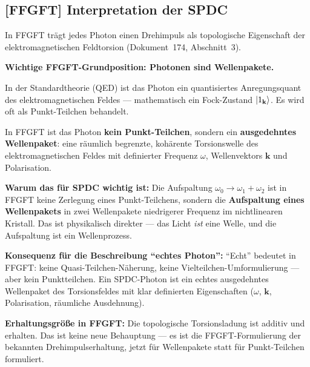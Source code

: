\subsection{[FFGFT] Interpretation der SPDC}

\begin{foundation}
In FFGFT trägt jedes Photon einen Drehimpuls als
topologische Eigenschaft der elektromagnetischen Feldtorsion
(Dokument~174, Abschnitt~3).

\textbf{Wichtige FFGFT-Grundposition: Photonen sind Wellenpakete.}

In der Standardtheorie (QED) ist das Photon ein quantisiertes
Anregungsquant des elektromagnetischen Feldes --- mathematisch
ein Fock-Zustand $\left|1_\mathbf{k}\right\rangle$.
Es wird oft als Punkt-Teilchen behandelt.

In FFGFT ist das Photon \textbf{kein Punkt-Teilchen},
sondern ein \textbf{ausgedehntes Wellenpaket}:
eine räumlich begrenzte, kohärente Torsionswelle des
elektromagnetischen Feldes mit definierter Frequenz $\omega$,
Wellenvektors $\mathbf{k}$ und Polarisation.

\textbf{Warum das für SPDC wichtig ist:}
Die Aufspaltung $\omega_0 \to \omega_1 + \omega_2$ ist
in FFGFT keine Zerlegung eines Punkt-Teilchens,
sondern die \textbf{Aufspaltung eines Wellenpakets}
in zwei Wellenpakete niedrigerer Frequenz im nichtlinearen Kristall.
Das ist physikalisch direkter --- das Licht \emph{ist} eine Welle,
und die Aufspaltung ist ein Wellenprozess.

\begin{center}
\end{center}

\textbf{Konsequenz für die Beschreibung ``echtes Photon'':}
``Echt'' bedeutet in FFGFT: keine Quasi-Teilchen-Näherung,
keine Vielteilchen-Umformulierung --- aber kein Punktteilchen.
Ein SPDC-Photon ist ein echtes ausgedehntes Wellenpaket
des Torsionsfeldes mit klar definierten Eigenschaften
($\omega$, $\mathbf{k}$, Polarisation, räumliche Ausdehnung).

\textbf{Erhaltungsgröße in FFGFT:}
Die topologische Torsionsladung ist additiv und erhalten.
Das ist keine neue Behauptung --- es ist die FFGFT-Formulierung
der bekannten Drehimpulserhaltung, jetzt für Wellenpakete
statt für Punkt-Teilchen formuliert.
\end{foundation}

